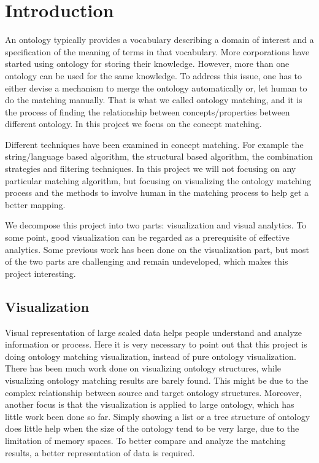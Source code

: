 \chapter{Introduction}
An ontology typically provides a vocabulary describing a domain of interest and a specification of the meaning of terms in that vocabulary. More corporations have started using ontology for storing their knowledge. However, more than one ontology can be used for the same knowledge. To address this issue, one has to either devise a mechanism to merge the ontology automatically or, let human to do the matching manually. That is what we called ontology matching, and it is the process of finding the relationship between concepts/properties between different ontology. In this project we focus on the concept matching.

    Different techniques have been examined in concept matching. For example the string/language based algorithm, the structural based algorithm, the combination strategies and filtering techniques. In this project we will not focusing on any particular matching algorithm, but focusing on visualizing the ontology matching process and the methods to involve human in the matching process to help get a better mapping.

    We decompose this project into two parts: visualization and visual analytics. To some point, good visualization can be regarded as a prerequisite of effective analytics. Some previous work has been done on the visualization part, but most of the two parts are challenging and remain undeveloped, which makes this project interesting.

\section{Visualization} %
\label{sub:visualization}
    Visual representation of large scaled data helps people understand and analyze information or process. Here it is very necessary to point out that this project is doing ontology matching visualization, instead of pure ontology visualization. There has been much work done on visualizing ontology structures, while visualizing ontology matching results are barely found. This might be due to the complex relationship between source and target ontology structures. Moreover, another focus is that the visualization is applied to large ontology, which has little work been done so far. Simply showing a list or a tree structure of ontology does little help when the size of the ontology tend to be very large, due to the limitation of memory spaces. To better compare and analyze the matching results, a better representation of data is required.

